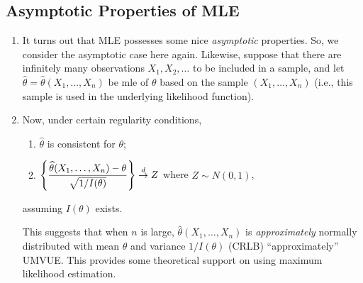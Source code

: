 \subsection{Asymptotic Properties of MLE}
\begin{enumerate}
\item It turns out that MLE possesses some nice \emph{asymptotic} properties.
So, we consider the asymptotic case here again. Likewise, suppose that there
are infinitely many observations \(X_1,X_2,\dotsc\) to be included in a sample,
and let \(\widehat{\theta}=\widehat{\theta}(X_1,\dotsc,X_n)\) be mle of
\(\theta\) based on the sample \((X_1,\dotsc,X_n)\) (i.e., this sample is used
in the underlying likelihood function).

\item \label{it:mle-asym-prop}
Now, under certain regularity conditions,
\begin{enumerate}
\item \(\widehat{\theta}\) is consistent for \(\theta\);
\item \(\displaystyle \left\{\frac{\widehat{\theta}(X_1,\dotsc,X_n)-\theta}{\sqrt{1/I(\theta)}}\right\}\overset{d}{\to} Z\) where \(Z\sim N(0,1)\),
\end{enumerate}
assuming \(I(\theta)\) exists.

\begin{note}
This suggests that when \(n\) is large, \(\widehat{\theta}(X_1,\dotsc,X_n)\)
is \emph{approximately} normally distributed with mean \(\theta\) and variance \(1/I(\theta)\) (CRLB)
 ``approximately'' UMVUE. This provides some theoretical
support on using maximum likelihood estimation.
\end{note}
\end{enumerate}

